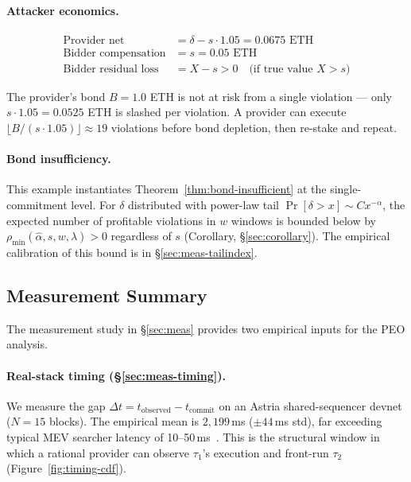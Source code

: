 \paragraph{Attacker economics.}
\begin{align}
  \text{Provider net} &= \delta - s \cdot 1.05 = 0.0675 \text{ ETH} \nonumber \\
  \text{Bidder compensation} &= s = 0.05 \text{ ETH} \nonumber \\
  \text{Bidder residual loss} &= X - s > 0 \quad \text{(if true value } X > s \text{)} \nonumber
\end{align}

The provider's bond $B = 1.0$ ETH is not at risk from a single violation ---
only $s \cdot 1.05 = 0.0525$ ETH is slashed per violation. A provider
can execute $\lfloor B / (s \cdot 1.05) \rfloor \approx 19$ violations
before bond depletion, then re-stake and repeat.

\paragraph{Bond insufficiency.}
This example instantiates Theorem~\ref{thm:bond-insufficient} at the
single-commitment level. For $\delta$ distributed with power-law tail
$\Pr[\delta > x] \sim C x^{-\alpha}$, the expected number of profitable
violations in $w$ windows is bounded below by
$\rho_{\min}(\hat{\alpha}, s, w, \lambda) > 0$ regardless of $s$
(Corollary, \S\ref{sec:corollary}). The empirical calibration of this
bound is in \S\ref{sec:meas-tailindex}.

\subsection{Measurement Summary}
\label{sec:peo-meas}

The measurement study in \S\ref{sec:meas} provides two empirical inputs
for the PEO analysis.

\paragraph{Real-stack timing (\S\ref{sec:meas-timing}).}
We measure the gap $\Delta t = t_{\text{observed}} - t_{\text{commit}}$ on an
Astria shared-sequencer devnet ($N=15$ blocks). The empirical mean is
$2{,}199$\,ms ($\pm44$\,ms std), far exceeding typical MEV searcher
latency of 10--50\,ms~\cite{daian2020flash}. This is the structural window
in which a rational provider can observe $\tau_1$'s execution and front-run
$\tau_2$ (Figure~\ref{fig:timing-cdf}).

